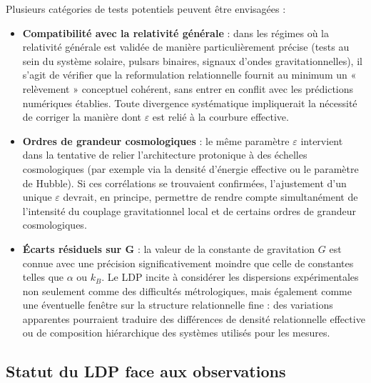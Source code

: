 \documentclass[11pt,a4paper]{article}
\begin{document}
Plusieurs catégories de tests potentiels peuvent être envisagées :
\begin{itemize}
  \item \textbf{Compatibilité avec la relativité générale} : dans les régimes où la relativité générale est validée de manière particulièrement précise (tests au sein du système solaire, pulsars binaires, signaux d’ondes gravitationnelles), il s’agit de vérifier que la reformulation relationnelle fournit au minimum un « relèvement » conceptuel cohérent, sans entrer en conflit avec les prédictions numériques établies. Toute divergence systématique impliquerait la nécessité de corriger la manière dont \(\varepsilon\) est relié à la courbure effective.
  \item \textbf{Ordres de grandeur cosmologiques} : le même paramètre \(\varepsilon\) intervient dans la tentative de relier l’architecture protonique à des échelles cosmologiques (par exemple via la densité d’énergie effective ou le paramètre de Hubble). Si ces corrélations se trouvaient confirmées, l’ajustement d’un unique \(\varepsilon\) devrait, en principe, permettre de rendre compte simultanément de l’intensité du couplage gravitationnel local et de certains ordres de grandeur cosmologiques.
  \item \textbf{Écarts résiduels sur \(\mathbf{G}\)} : la valeur de la constante de gravitation \(G\) est connue avec une précision significativement moindre que celle de constantes telles que \(\alpha\) ou \(k_B\). Le LDP incite à considérer les dispersions expérimentales non seulement comme des difficultés métrologiques, mais également comme une éventuelle fenêtre sur la structure relationnelle fine : des variations apparentes pourraient traduire des différences de densité relationnelle effective ou de composition hiérarchique des systèmes utilisés pour les mesures.
\end{itemize}

\subsection{Statut du LDP face aux observations}
\end{document}

